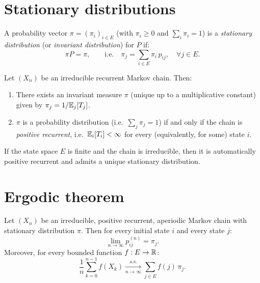 \section{Stationary distributions}

\begin{definition}
\label{def:stationary}
A probability vector $\pi = (\pi_i)_{i \in E}$ (with $\pi_i \geq 0$ and
$\sum_i \pi_i = 1$) is a \emph{stationary distribution} (or \emph{invariant
distribution}) for $P$ if:
\[
    \pi P = \pi, \qquad \text{i.e.} \quad
    \pi_j = \sum_{i \in E} \pi_i\, p_{ij}, \quad \forall j \in E.
\]
\end{definition}

\begin{theorem}
\label{thm:existence_stationary}
Let $(X_n)$ be an irreducible recurrent Markov chain. Then:
\begin{enumerate}
    \item There exists an invariant measure $\pi$ (unique up to a multiplicative
    constant) given by $\pi_j = 1/\mathbb{E}_j[T_j]$.
    \item $\pi$ is a probability distribution (i.e.\ $\sum_j \pi_j = 1$) if and only
    if the chain is \emph{positive recurrent}, i.e.\ $\mathbb{E}_i[T_i] < \infty$ for every
    (equivalently, for some) state $i$.
\end{enumerate}
\end{theorem}

\begin{remark}
If the state space $E$ is finite and the chain is irreducible, then it is
automatically positive recurrent and admits a unique stationary distribution.
\end{remark}

\section{Ergodic theorem}

\begin{theorem}
\label{thm:ergodic}
Let $(X_n)$ be an irreducible, positive recurrent, aperiodic Markov chain with
stationary distribution $\pi$. Then for every initial state $i$ and every state $j$:
\[
    \lim_{n \to \infty} p_{ij}^{(n)} = \pi_j.
\]
Moreover, for every bounded function $f : E \to \mathbb{R}$:
\[
    \frac{1}{n} \sum_{k=0}^{n-1} f(X_k)
    \xrightarrow[n \to \infty]{\text{a.s.}} \sum_{j \in E} f(j)\, \pi_j.
\]
\end{theorem}

